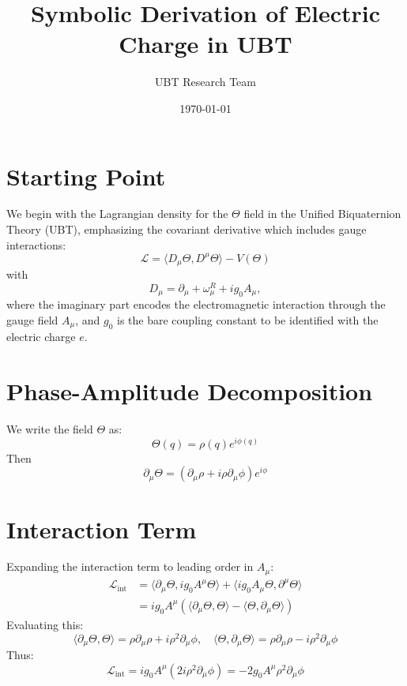 \documentclass[12pt,a4paper]{article}
\title{Symbolic Derivation of Electric Charge in UBT}
\author{UBT Research Team}
\date{\today}
\begin{document}
\maketitle

\section{Starting Point}

We begin with the Lagrangian density for the $\Theta$ field in the Unified Biquaternion Theory (UBT), emphasizing the covariant derivative which includes gauge interactions:
\begin{equation}
    \mathcal{L} = \langle D_\mu \Theta, D^\mu \Theta \rangle - V(\Theta)
\end{equation}
with
\begin{equation}
    D_\mu = \partial_\mu + \omega_\mu^R + i g_0 A_\mu,
\end{equation}
where the imaginary part encodes the electromagnetic interaction through the gauge field $A_\mu$, and $g_0$ is the bare coupling constant to be identified with the electric charge $e$.

\section{Phase-Amplitude Decomposition}

We write the field $\Theta$ as:
\begin{equation}
    \Theta(q) = \rho(q) e^{i \phi(q)}
\end{equation}
Then
\begin{equation}
    \partial_\mu \Theta = \left( \partial_\mu \rho + i \rho \partial_\mu \phi \right) e^{i\phi}
\end{equation}

\section{Interaction Term}

Expanding the interaction term to leading order in $A_\mu$:
\begin{align}
    \mathcal{L}_{\text{int}} &= \langle \partial_\mu \Theta, i g_0 A^\mu \Theta \rangle + \langle i g_0 A_\mu \Theta, \partial^\mu \Theta \rangle \\
    &= i g_0 A^\mu \left( \langle \partial_\mu \Theta, \Theta \rangle - \langle \Theta, \partial_\mu \Theta \rangle \right)
\end{align}
Evaluating this:
\begin{equation}
    \langle \partial_\mu \Theta, \Theta \rangle = \rho \partial_\mu \rho + i \rho^2 \partial_\mu \phi,
    \quad
    \langle \Theta, \partial_\mu \Theta \rangle = \rho \partial_\mu \rho - i \rho^2 \partial_\mu \phi
\end{equation}
Thus:
\begin{equation}
    \mathcal{L}_{\text{int}} = i g_0 A^\mu (2 i \rho^2 \partial_\mu \phi) = -2 g_0 A^\mu \rho^2 \partial_\mu \phi
\end{equation}
\end{document}
